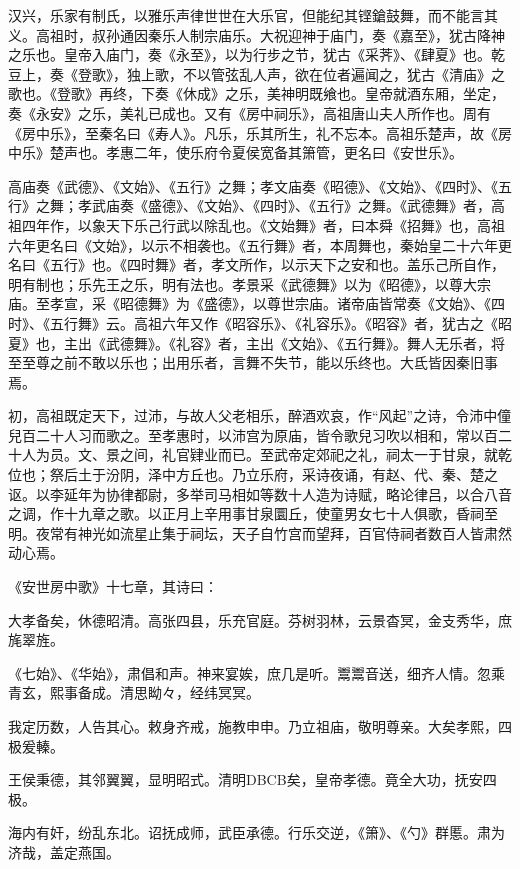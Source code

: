 \documentclass[]{article}
\begin{document}
汉兴，乐家有制氏，以雅乐声律世世在大乐官，但能纪其铿鎗鼓舞，而不能言其义。高祖时，叔孙通因秦乐人制宗庙乐。大祝迎神于庙门，奏《嘉至》，犹古降神之乐也。皇帝入庙门，奏《永至》，以为行步之节，犹古《采荠》、《肆夏》也。乾豆上，奏《登歌》，独上歌，不以管弦乱人声，欲在位者遍闻之，犹古《清庙》之歌也。《登歌》再终，下奏《休成》之乐，美神明既飨也。皇帝就酒东厢，坐定，奏《永安》之乐，美礼已成也。又有《房中祠乐》，高祖唐山夫人所作也。周有《房中乐》，至秦名曰《寿人》。凡乐，乐其所生，礼不忘本。高祖乐楚声，故《房中乐》楚声也。孝惠二年，使乐府令夏侯宽备其箫管，更名曰《安世乐》。

高庙奏《武德》、《文始》、《五行》之舞；孝文庙奏《昭德》、《文始》、《四时》、《五行》之舞；孝武庙奏《盛德》、《文始》、《四时》、《五行》之舞。《武德舞》者，高祖四年作，以象天下乐己行武以除乱也。《文始舞》者，曰本舜《招舞》也，高祖六年更名曰《文始》，以示不相袭也。《五行舞》者，本周舞也，秦始皇二十六年更名曰《五行》也。《四时舞》者，孝文所作，以示天下之安和也。盖乐己所自作，明有制也；乐先王之乐，明有法也。孝景采《武德舞》以为《昭德》，以尊大宗庙。至孝宣，采《昭德舞》为《盛德》，以尊世宗庙。诸帝庙皆常奏《文始》、《四时》、《五行舞》云。高祖六年又作《昭容乐》、《礼容乐》。《昭容》者，犹古之《昭夏》也，主出《武德舞》。《礼容》者，主出《文始》、《五行舞》。舞人无乐者，将至至尊之前不敢以乐也；出用乐者，言舞不失节，能以乐终也。大氐皆因秦旧事焉。

初，高祖既定天下，过沛，与故人父老相乐，醉酒欢哀，作``风起''之诗，令沛中僮兒百二十人习而歌之。至孝惠时，以沛宫为原庙，皆令歌兒习吹以相和，常以百二十人为员。文、景之间，礼官肄业而已。至武帝定郊祀之礼，祠太一于甘泉，就乾位也；祭后土于汾阴，泽中方丘也。乃立乐府，采诗夜诵，有赵、代、秦、楚之讴。以李延年为协律都尉，多举司马相如等数十人造为诗赋，略论律吕，以合八音之调，作十九章之歌。以正月上辛用事甘泉圜丘，使童男女七十人俱歌，昏祠至明。夜常有神光如流星止集于祠坛，天子自竹宫而望拜，百官侍祠者数百人皆肃然动心焉。

《安世房中歌》十七章，其诗曰：

大孝备矣，休德昭清。高张四县，乐充官庭。芬树羽林，云景杳冥，金支秀华，庶旄翠旌。

《七始》、《华始》，肃倡和声。神来宴娭，庶几是听。鬻鬻音送，细齐人情。忽乘青玄，熙事备成。清思眑々，经纬冥冥。

我定历数，人告其心。敕身齐戒，施教申申。乃立祖庙，敬明尊亲。大矣孝熙，四极爰轃。

王侯秉德，其邻翼翼，显明昭式。清明DBCB矣，皇帝孝德。竟全大功，抚安四极。

海内有奸，纷乱东北。诏抚成师，武臣承德。行乐交逆，《箫》、《勺》群慝。肃为济哉，盖定燕国。
\end{document}
